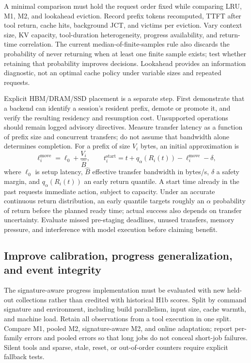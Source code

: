 \documentclass[11pt,a4paper]{article}
\begin{document}
A minimal comparison must hold the request order fixed while comparing LRU, M1, M2, and lookahead eviction. Record prefix tokens recomputed, TTFT after tool return, cache hits, background JCT, and victims per eviction. Vary context size, KV capacity, tool-duration heterogeneity, progress availability, and return-time correlation. The current median-of-finite-samples rule also discards the probability of never returning when at least one finite sample exists; test whether retaining that probability improves decisions. Lookahead provides an information diagnostic, not an optimal cache policy under variable sizes and repeated requests.

Explicit HBM/DRAM/SSD placement is a separate step. First demonstrate that a backend can identify a session's resident prefix, demote or promote it, and verify the resulting residency and resumption cost. Unsupported operations should remain logged advisory directives. Measure transfer latency as a function of prefix size and concurrent transfers; do not assume that bandwidth alone determines completion. For a prefix of size \(V_i\) bytes, an initial approximation is
\begin{equation}
\ell_i^{\mathrm{move}}=\ell_0+\frac{V_i}{\widehat B},\qquad
 t_i^{\mathrm{start}}=t+q_\alpha(R_i(t))-\ell_i^{\mathrm{move}}-\delta,
\label{eq:prestaging}
\end{equation}
where \(\ell_0\) is setup latency, \(\widehat B\) effective transfer bandwidth in bytes/s, \(\delta\) a safety margin, and \(q_\alpha(R_i(t))\) an early return quantile. A start time already in the past requests immediate action, subject to capacity. Under an accurate continuous return distribution, an early quantile targets roughly an \(\alpha\) probability of return before the planned ready time; actual success also depends on transfer uncertainty. Evaluate missed pre-staging deadlines, unused transfers, memory pressure, and interference with model execution before claiming benefit.

\subsection{Improve calibration, progress generalization, and event integrity}
The signature-aware progress implementation must be evaluated with new held-out collections rather than credited with historical H1b scores. Split by command signature and environment, including build parallelism, input size, cache warmth, and machine load. Retain all observations from a tool execution in one split. Compare M1, pooled M2, signature-aware M2, and online adaptation; report per-family errors and pooled errors so that long jobs do not conceal short-job failures. Silent tools and sparse, stale, reset, or out-of-order counters require explicit fallback tests.
\end{document}
